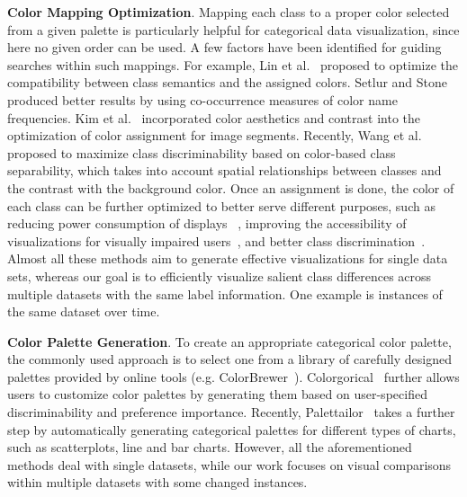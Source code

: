 \vspace{1.5mm}
\noindent\textbf{Color Mapping Optimization}. Mapping each class to a proper color selected from a given palette is particularly helpful for categorical data visualization, since here no given order can be used. %
A few %
factors have been identified for guiding searches within such mappings.
For example, Lin et al.~\cite{lin2013selecting} proposed to optimize the compatibility between class semantics and the assigned colors. Setlur and Stone~\cite{setlur2016linguistic} produced better results by using co-occurrence measures of color name frequencies.
Kim et al.~\cite{Kim14} incorporated color aesthetics and contrast into the optimization of color assignment for image segments.
Recently, Wang et al.~\cite{Wang2018} proposed to maximize class discriminability based on color-based class separability, which takes into account spatial relationships between classes and the contrast with the background color.
Once an assignment is done, the color of each class can be further optimized to better serve different purposes, such as reducing power consumption of displays~\cite{chuang2009energy} ,
improving the accessibility of visualizations for visually impaired users~\cite{machado2009physiologically}, and better class discrimination~\cite{lee2013perceptually}.
Almost all these methods aim to generate effective visualizations for single data sets, whereas our goal is to efficiently visualize salient class differences across multiple datasets with the same label information. One example is instances of the same dataset over time.

\vspace{1.5mm}
\noindent\textbf{Color Palette Generation}.
To create an appropriate categorical color palette, the commonly used approach is to select one from a library of carefully designed palettes provided by online tools (e.g. ColorBrewer~\cite{harrower2003colorbrewer}).
Colorgorical~\cite{Gramazio17} further allows users to customize color palettes by generating them based on user-specified discriminability and preference importance.
Recently, Palettailor~\cite{Lu21} takes a further step by automatically generating categorical palettes for different types of charts, such as scatterplots, line and bar charts.
However, all the aforementioned methods deal with single datasets, while our work focuses on visual comparisons within multiple
datasets with some changed instances.

